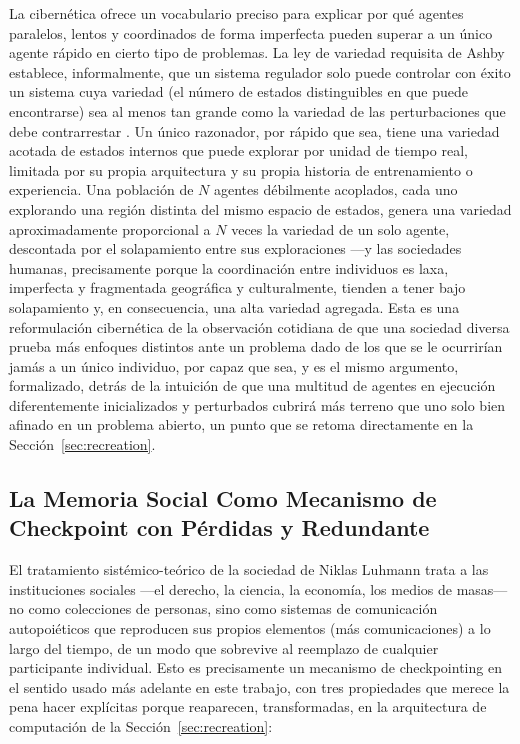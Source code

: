 \documentclass[11pt]{article}
\begin{document}
La cibernética ofrece un vocabulario preciso para explicar por qué agentes paralelos, lentos y coordinados de forma imperfecta pueden superar a un único agente rápido en cierto tipo de problemas. La ley de variedad requisita de Ashby establece, informalmente, que un sistema regulador solo puede controlar con éxito un sistema cuya variedad (el número de estados distinguibles en que puede encontrarse) sea al menos tan grande como la variedad de las perturbaciones que debe contrarrestar \citep{ashby1956introduction}. Un único razonador, por rápido que sea, tiene una variedad acotada de estados internos que puede explorar por unidad de tiempo real, limitada por su propia arquitectura y su propia historia de entrenamiento o experiencia. Una población de $N$ agentes débilmente acoplados, cada uno explorando una región distinta del mismo espacio de estados, genera una variedad aproximadamente proporcional a $N$ veces la variedad de un solo agente, descontada por el solapamiento entre sus exploraciones —y las sociedades humanas, precisamente porque la coordinación entre individuos es laxa, imperfecta y fragmentada geográfica y culturalmente, tienden a tener bajo solapamiento y, en consecuencia, una alta variedad agregada. Esta es una reformulación cibernética de la observación cotidiana de que una sociedad diversa prueba más enfoques distintos ante un problema dado de los que se le ocurrirían jamás a un único individuo, por capaz que sea, y es el mismo argumento, formalizado, detrás de la intuición de que una multitud de agentes en ejecución diferentemente inicializados y perturbados cubrirá más terreno que uno solo bien afinado en un problema abierto, un punto que se retoma directamente en la Sección~\ref{sec:recreation}.

\subsection{La Memoria Social Como Mecanismo de Checkpoint con Pérdidas y Redundante}

El tratamiento sistémico-teórico de la sociedad de Niklas Luhmann \citep{luhmann1995social} trata a las instituciones sociales —el derecho, la ciencia, la economía, los medios de masas— no como colecciones de personas, sino como sistemas de comunicación autopoiéticos que reproducen sus propios elementos (más comunicaciones) a lo largo del tiempo, de un modo que sobrevive al reemplazo de cualquier participante individual. Esto es precisamente un mecanismo de checkpointing en el sentido usado más adelante en este trabajo, con tres propiedades que merece la pena hacer explícitas porque reaparecen, transformadas, en la arquitectura de computación de la Sección~\ref{sec:recreation}:
\end{document}
